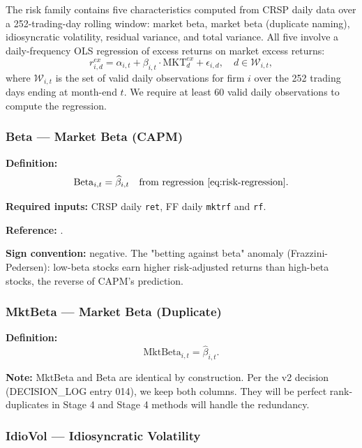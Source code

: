 The risk family contains five characteristics computed from CRSP daily
data over a 252-trading-day rolling window: market beta, market beta
(duplicate naming), idiosyncratic volatility, residual variance, and
total variance. All five involve a daily-frequency OLS regression of
excess returns on market excess returns:
\begin{equation}
r^{ex}_{i,d} = \alpha_{i,t} + \beta_{i,t} \cdot \mathrm{MKT}^{ex}_d + \epsilon_{i,d},
\quad d \in \mathcal{W}_{i,t},
\label{eq:risk-regression}
\end{equation}
where $\mathcal{W}_{i,t}$ is the set of valid daily observations for
firm $i$ over the 252 trading days ending at month-end $t$. We require
at least 60 valid daily observations to compute the regression.

\subsubsection{Beta --- Market Beta (CAPM)}

\textbf{Definition:}
\begin{equation}
\mathrm{Beta}_{i,t} = \widehat{\beta}_{i,t}
\quad \text{from regression~\eqref{eq:risk-regression}}.
\label{eq:beta}
\end{equation}

\textbf{Required inputs:} CRSP daily \texttt{ret}, FF daily
\texttt{mktrf} and \texttt{rf}.

\textbf{Reference:} \cite{Sharpe1964,FrazziniPedersen2014}.

\textbf{Sign convention:} negative. The "betting against beta" anomaly
(Frazzini-Pedersen): low-beta stocks earn higher risk-adjusted returns
than high-beta stocks, the reverse of CAPM's prediction.

\subsubsection{MktBeta --- Market Beta (Duplicate)}

\textbf{Definition:}
\begin{equation}
\mathrm{MktBeta}_{i,t} = \widehat{\beta}_{i,t}.
\label{eq:mktbeta}
\end{equation}

\textbf{Note:} MktBeta and Beta are identical by construction. Per
the v2 decision (DECISION\_LOG entry 014), we keep both columns. They
will be perfect rank-duplicates in Stage 4 and Stage 4 methods will
handle the redundancy.

\subsubsection{IdioVol --- Idiosyncratic Volatility}

